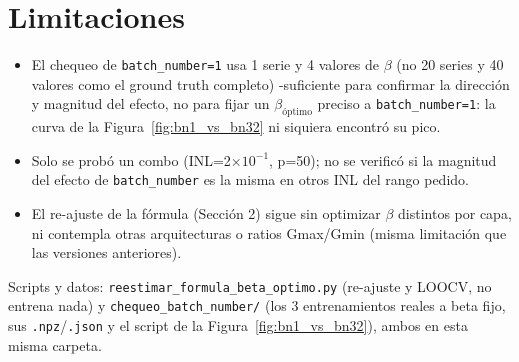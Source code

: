 \documentclass[11pt]{article}
\begin{document}
\section{Limitaciones}

\begin{itemize}
\item El chequeo de \texttt{batch\_number=1} usa 1 serie y 4 valores de $\beta$ (no 20 series
y 40 valores como el ground truth completo) -suficiente para confirmar la dirección y magnitud
del efecto, no para fijar un $\beta_{\text{óptimo}}$ preciso a \texttt{batch\_number=1}: la
curva de la Figura~\ref{fig:bn1_vs_bn32} ni siquiera encontró su pico.
\item Solo se probó un combo (INL=2$\times10^{-1}$, p=50); no se verificó si la magnitud del
efecto de \texttt{batch\_number} es la misma en otros INL del rango pedido.
\item El re-ajuste de la fórmula (Sección 2) sigue sin optimizar $\beta$ distintos por capa, ni
contempla otras arquitecturas o ratios Gmax/Gmin (misma limitación que las versiones
anteriores).
\end{itemize}

Scripts y datos: \texttt{reestimar\_formula\_beta\_optimo.py} (re-ajuste y LOOCV, no entrena
nada) y \texttt{chequeo\_batch\_number/} (los 3 entrenamientos reales a beta fijo, sus
\texttt{.npz}/\texttt{.json} y el script de la Figura~\ref{fig:bn1_vs_bn32}), ambos en esta
misma carpeta.
\end{document}
